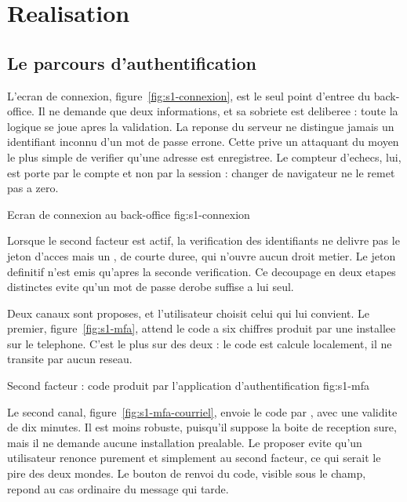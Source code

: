 \section{Realisation}

\subsection{Le parcours d'authentification}

L'ecran de connexion, figure~\ref{fig:s1-connexion}, est le seul point
d'entree du back-office. Il ne demande que deux informations, et sa
sobriete est deliberee : toute la logique se joue apres la validation.
La reponse du serveur ne distingue jamais un identifiant inconnu d'un mot
de passe errone. Cette 
prive un attaquant du moyen le plus simple de verifier qu'une adresse est
enregistree. Le compteur d'echecs, lui, est porte par le compte et non par
la session : changer de navigateur ne le remet pas a zero.

  {Ecran de connexion au back-office}
  {fig:s1-connexion}

Lorsque le second facteur est actif, la verification des identifiants ne
delivre pas le jeton d'acces mais un , de
courte duree, qui n'ouvre aucun droit metier. Le jeton definitif n'est
emis qu'apres la seconde verification. Ce decoupage en deux etapes
distinctes evite qu'un mot de passe derobe suffise a lui seul.

Deux canaux sont proposes, et l'utilisateur choisit celui qui lui
convient. Le premier, figure~\ref{fig:s1-mfa}, attend le code a six
chiffres produit par une 
installee sur le telephone. C'est le plus sur des deux : le code est
calcule localement, il ne transite par aucun reseau.

  {Second facteur : code produit par l'application d'authentification}
  {fig:s1-mfa}

Le second canal, figure~\ref{fig:s1-mfa-courriel}, envoie le code par
, avec une validite de dix minutes. Il est moins
robuste, puisqu'il suppose la boite de reception sure, mais il ne
demande aucune installation prealable. Le proposer evite qu'un
utilisateur renonce purement et simplement au second facteur, ce qui
serait le pire des deux mondes. Le bouton de renvoi du code, visible sous
le champ, repond au cas ordinaire du message qui tarde.

